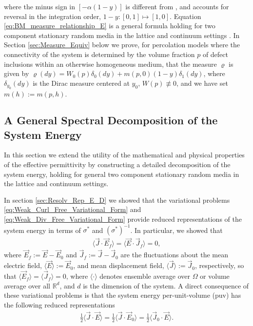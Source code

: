 \documentclass[english,12pt,jmp,graphicx]{revtex4-1}
\begin{document}
%
where the minus sign in $[-\alpha(1-y)]$ is different from
\cite{Day:JPCM-96}, and accounts for reversal in the integration
order, $1-y:[0,1]\mapsto[1,0]$. Equation
\eqref{eq:BM_measure_relationship_E} is a general formula holding for  
two component stationary random media in the lattice and continuum
settings \cite{Golden:PRL-3935}. In Section \ref{sec:Measure_Equiv}
below we prove, for percolation models where the connectivity of
the system is determined by the volume fraction $p$ of defect
inclusions within an otherwise homogeneous medium, that the measure
$\varrho$ is given by $\varrho(dy)=W_0(p)\delta_0(dy)+m(p,0)(1-y)\delta_1(dy)$, where
$\delta_{y_0}(dy)$ is the Dirac measure centered at $y_0$, $W(p)\not\equiv0$,
and we have set $m(h):=m(p,h)$. 

%
%
%
\subsection{A General Spectral Decomposition of the System Energy}
\label{subsec:Spec_Decomp_Energy}
%
In this section we extend the utility of the mathematical and physical
properties of the effective permittivity by constructing a detailed
decomposition of the system energy, holding for general two component
stationary random media in the lattice and continuum settings.

In
section \ref{sec:Resolv_Rep_E_D} we showed that the variational 
problems \eqref{eq:Weak_Curl_Free_Variational_Form} and
\eqref{eq:Weak_Div_Free_Variational_Form} provide reduced
representations of the system energy in terms of $\sigma^*$ and
$(\sigma^*)^{-1}$. In particular, we showed that
%
\begin{align}\label{eq:Energy_Constraint_E_D}
  \langle\vec{J}\cdot\vec{E}_f\rangle=\langle\vec{E}\cdot\vec{J}_f\rangle=0,
\end{align}
%
where $\vec{E}_f:=\vec{E}-\vec{E}_0$ and
$\vec{J}_f:=\vec{J}-\vec{J}_0$ are the fluctuations about the mean
electric field, $\langle\vec{E}\rangle:=\vec{E}_0$, and mean displacement field, 
$\langle\vec{J}\rangle:=\vec{J}_0$, respectively, so that $\langle\vec{E}_f\rangle=\langle\vec{J}_f\rangle=0$, where
$\langle\cdot\rangle$ denotes ensemble average over $\Omega$ or volume average over all
$\mathbb{R}^d$, and $d$ is the dimension of the system. A direct
consequence of these variational problems is that the system energy
per-unit-volume (puv) has the following reduced representations
\cite{Jackson-1999}  
%
\begin{align}\label{eq:Reduced_Energy_E_D}
  \frac{1}{2}\langle\vec{J}\cdot\vec{E}\rangle=\frac{1}{2}\langle\vec{J}\cdot\vec{E}_0\rangle
  =\frac{1}{2}\langle\vec{J}_0\cdot\vec{E}\rangle.
\end{align}
%
\end{document}
